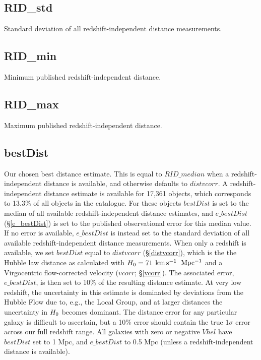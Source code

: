 \documentclass[twocolumn,tighten]{aastex62}
\newcommand{\kms}{$\rm km\, s^{-1}$}
\begin{document}
\subsection{RID\_std} \label{RID_std}
Standard deviation of all redshift-independent distance measurements.

\subsection{RID\_min} \label{RID_min}
Minimum published redshift-independent distance.

\subsection{RID\_max} \label{RID_max}
Maximum published redshift-independent distance.

\subsection{bestDist} \label{bestDist}
Our chosen best distance estimate. This is equal to $RID\_median$ when a redshift-independent distance is available, and otherwise defaults to $distvcorr$. A redshift-independent distance estimate is available for 17,361 objects, which corresponds to 13.3\% of all objects in the catalogue. For these objects $bestDist$ is set to the median of all available redshift-independent distance estimates, and $e\_bestDist$ (\S \ref{e_bestDist}) is set to the published observational error for this median value. If no error is available, $e\_bestDist$ is instead set to the standard deviation of all available redshift-independent distance measurements. When only a redshift is available, we set $bestDist$ equal to $distvcorr$ (\S \ref{distvcorr}), which is the the Hubble law distance as calculated with $H_{\rm 0} = 71$ \kms~$\rm Mpc^{-1}$ and a Virgocentric flow-corrected velocity ($vcorr$; \S \ref{vcorr}). The associated error, $e\_bestDist$, is then set to 10\% of the resulting distance estimate. At very low redshift, the uncertainty in this estimate is dominated by deviations from the Hubble Flow due to, e.g., the Local Group, and at larger distances the uncertainty in $H_{\rm 0}$ becomes dominant. The distance error for any particular galaxy is difficult to ascertain, but a 10\% error should contain the true $1\sigma$ error across our full redshift range. All galaxies with zero or negative $Vhel$ have $bestDist$ set to 1 Mpc, and $e\_bestDist$ to 0.5 Mpc (unless a redshift-independent distance is available). 
\end{document}
